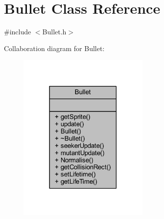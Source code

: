 \hypertarget{class_bullet}{}\section{Bullet Class Reference}
\label{class_bullet}


{\ttfamily \#include $<$Bullet.\+h$>$}



Collaboration diagram for Bullet\+:
\nopagebreak
\begin{figure}[H]
\begin{center}
\leavevmode
\includegraphics[width=182pt]{class_bullet__coll__graph}
\end{center}
\end{figure}
